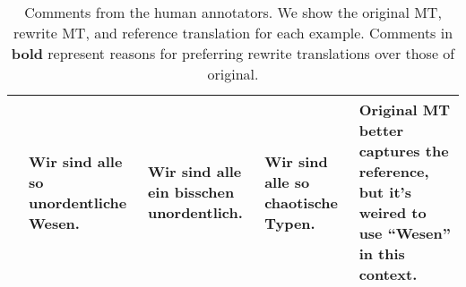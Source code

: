 \begin{table*}[!htp]
{\begin{tabular}{c | p{3.5cm} p{3.5cm} p{3.5cm} p{4.5cm}}
    & Wir sind alle so unordentliche Wesen. & Wir sind alle ein bisschen unordentlich. & Wir sind alle so chaotische Typen. & Original MT better captures the reference, but it's weired to use ``Wesen'' in this context. \\

    
    \bottomrule
    \end{tabular}
}
\caption{Comments from the human annotators. We show the original MT, rewrite MT, and reference translation for each example. Comments in \textbf{bold} represent reasons for preferring rewrite translations over those of original.}
\label{tab:annotator_feedback}
\end{table*}